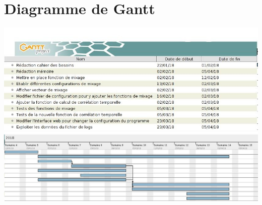 \documentclass{article}
\begin{document}
\section{Diagramme de Gantt}

\centering
\includegraphics[scale=0.50]{liste_task.jpg}
\centering
\includegraphics[scale=0.40]{diag_gantt.jpg}


\end{document}
